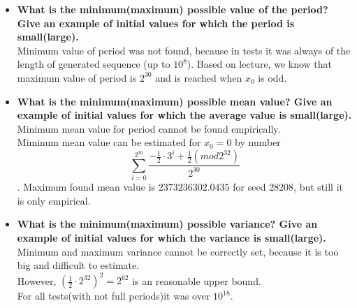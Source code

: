 \documentclass[a4paper,10pt]{article}
\begin{document}
\begin{itemize}
 \item \textbf{What is the minimum(maximum) possible value of the period? Give an example of initial values for which the period is small(large).} \\ 
Minimum value of period was not found, because in tests it was always of the length of generated sequence (up to $10^8$).  Based on lecture, we know that maximum value of period is $2^{30}$ and is reached when $x_0$ is odd.

 \item \textbf{What is the minimum(maximum) possible mean value? Give an example of initial values for which the average value is small(large).} \\
Minimum mean value for period cannot be found empirically. \\
Miminum mean value can be estimated for $x_0 = 0$ by number $$\sum_{i=0}^{2^{30}}\frac{-\frac{1}{2} \cdot 3^{i} + \frac{1}{2}(mod 2^{32})}{2^{30}}$$.
Maximum found mean value is $2373236302.0435$ for seed $28208$, but still it is only empirical.

 \item \textbf{What is the minimum(maximum) possible variance? Give an example of initial values for which the variance is small(large).} \\
Minimum and maximum variance cannot be correctly set, because it is too big and difficult to estimate. \\
However, $(\frac{1}{2} \cdot 2^{32})^2 = 2^{62}$ is an reasonable upper bound.
\\ For all tests(with not full periods)it was over $10^{18}$.


\end{itemize}
\end{document}
